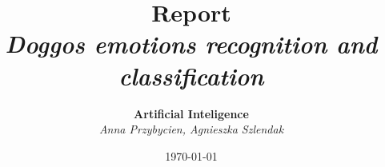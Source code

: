 \documentclass[11pt]{diazessay} %
\title{\textbf{Report} \\ {\Large\itshape Doggos emotions recognition and classification}} %
\author{\textbf{Artificial Inteligence} \\ \textit{Anna Przybycien, Agnieszka Szlendak}} %
\date{\today} %
\begin{document}
\maketitle %



\begin{abstract}

\end{abstract}


\vspace{10pt} %

\end{document}
